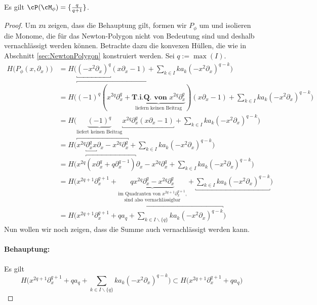 \begin{lem}
Es gilt $\cP(\cM_{\phi})=\{\frac{q}{q+1}\}$.
\end{lem}
\begin{proof}
\begin{comment}
\cite[5.b.]{sabbah_Fourier-local}
\end{comment}
Um zu zeigen, dass die Behauptung gilt, formen wir $P_{\phi}$ um und isolieren
die Monome, die für das Newton-Polygon nicht von Bedeutung sind und deshalb
vernachlässigt werden können. Betrachte dazu die konvexen Hüllen, die wie in
Abschnitt \ref{sec:NewtonPolygon} konstruiert werden. Sei $q:=\max(I)$.
\begin{align*}
H\Big(P_{\phi}(x,\partial_x)\Big) &= H\Big(\underbracket{(-x^2\partial_x)^{q}}
  (x\partial_x-1) + \sum_{k\in I}k a_k(-x^2\partial_x)^{q-k}\Big)
\\&= H\Big(\overbracket{(-1)^q(x^{2q}\partial_x^q
  + \underset{\text{liefern keinen Beitrag}}{
  \underbrace{\textbf{T.i.Q. von }x^{2q}\partial_x^q}})}
  (x\partial_x - 1) + \sum_{k\in I}k a_k(-x^2\partial_x)^{q-k} \Big)
\\&= H\Big(\underset{\text{liefert keinen Beitrag}}{\underbrace{(-1)^q}}
  \underbracket{x^{2q}\partial_x^q (x\partial_x - 1)}
  + \sum_{k\in I}k a_k(-x^2\partial_x)^{q-k} \Big)
\\&= H\Big(\overbracket{x^{2q}\underbracket{\partial_x^q x}\partial_x
  - x^{2q}\partial_x^q} + \sum_{k\in I}k a_k(-x^2\partial_x)^{q-k} \Big)
\\&= H\Big(x^{2q}\overbracket{(x\partial_x^q + q\partial_x^{q-1})}\partial_x
  - x^{2q}\partial_x^q + \sum_{k\in I}k a_k(-x^2\partial_x)^{q-k} \Big)
\\&= H\Big(x^{2q + 1}\partial_x^{q + 1}
  + \underset{\text{sind also vernachlässigbar}}{
  \underset{\text{im Quadranten von $x^{2q + 1}\partial_x^{q + 1}$,}}{
  \underbrace{qx^{2q}\partial_x^{q} - x^{2q}\partial_x^q}}}
  +\underbracket{ \sum_{k\in I}k a_k(-x^2\partial_x)^{q-k}} \Big)
\\&= H\Big(x^{2q + 1}\partial_x^{q + 1} +\overbracket{ qa_q
  + \sum_{k\in I\backslash\{q\}}k a_k(-x^2\partial_x)^{q-k}} \Big)
\end{align*}
Nun wollen wir noch zeigen, dass die Summe auch vernachlässigt werden kann.
\paragraph{Behauptung:} Es gilt
\[
H\Big(x^{2q + 1}\partial_x^{q + 1} + qa_q
  + \sum_{k\in I\backslash\{q\}}k a_k(-x^2\partial_x)^{q-k} \Big)
\subset H\Big(x^{2q + 1}\partial_x^{q + 1} + qa_q \Big)
\]

\end{proof}
